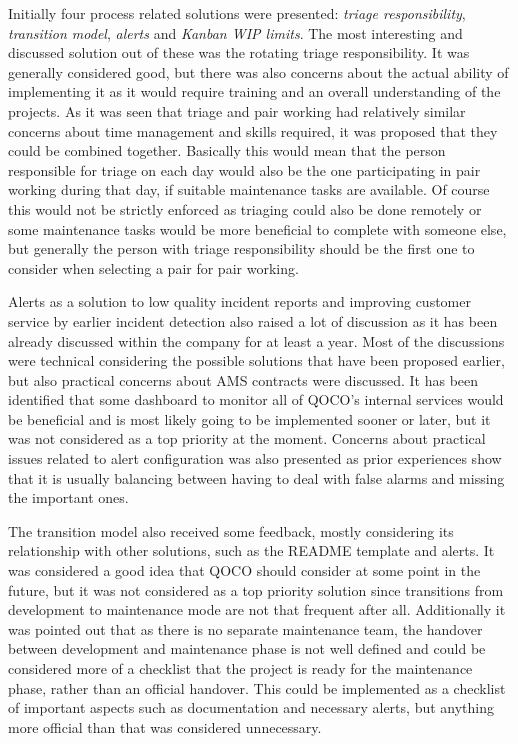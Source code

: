 Initially four process related solutions were presented: \emph{triage responsibility}, \emph{transition model}, \emph{alerts} and \emph{Kanban WIP limits}.
The most interesting and discussed solution out of these was the rotating triage responsibility.
It was generally considered good, but there was also concerns about the actual ability
of implementing it as it would require training and an overall understanding of the projects. As it was seen that triage and pair working had relatively similar concerns about
time management and skills required, it was proposed that they could be combined together. Basically this would mean that the person responsible for triage on each day
would also be the one participating in pair working during that day, if suitable maintenance tasks are available. Of course this would not be strictly enforced as triaging
could also be done remotely or some maintenance tasks would be more beneficial to complete with someone else, but generally the person with triage responsibility should be
the first one to consider when selecting a pair for pair working.

Alerts as a solution to low quality incident reports and improving customer service by earlier incident detection also raised a lot of discussion as it has been already
discussed within the company for at least a year. Most of the discussions were technical considering the possible solutions that have been proposed earlier, but also
practical concerns about AMS contracts were discussed. It has been identified that some dashboard to monitor all of QOCO's internal services would be beneficial and is most
likely going to be implemented sooner or later, but it was not considered as a top priority at the moment. Concerns about practical issues related to alert configuration
was also presented as prior experiences show that it is usually balancing between having to deal with false alarms and missing the important ones.

The transition model also received some feedback, mostly considering its relationship with other solutions, such as the README template and alerts. It was considered a good idea that QOCO
should consider at some point in the future, but it was not considered as a top priority solution since transitions from development to maintenance mode are not that frequent
after all. Additionally it was pointed out that as there is no separate maintenance team, the handover between development and maintenance phase is not well defined and
could be considered more of a checklist that the project is ready for the maintenance phase, rather than an official handover. This could be implemented as a checklist of
important aspects such as documentation and necessary alerts, but anything more official than that was considered unnecessary.

